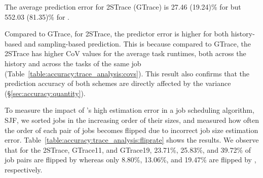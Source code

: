 {{
{The average prediction error for 2STrace (GTrace) is 27.46 (19.24)\% for \namepredict
but 552.03 (81.35)\%} for \primarybasepredict.
\fi


Compared to GTrace,  for 2STrace,
the predictor error is higher for both history-based and sampling-based
prediction. This is because
compared to GTrace, the 2STrace has higher CoV values for
the average task runtimes, both across the history and across the tasks of
the same job (Table~\ref{table:accuracy:trace_analysis:covs}). This result
also confirms that the prediction accuracy of both schemes are directly affected by 
the variance (\S\ref{sec:accuracy:quantity}).


{To measure the impact of \primarybasepredict's high estimation error in
a job scheduling algorithm, \eg SJF, 
we sorted jobs in the increasing order of their sizes, and measured how often
the order of each pair of jobs becomes flipped due to incorrect job size
estimation error.  Table~\ref{table:accuracy:trace_analysis:fliprate} shows the
results.  We observe that for the 2STrace, GTrace11, and GTrace19, 23.71\%,
25.83\%, and 39.72\% of job pairs are flipped by \primarybasepredict whereas
only 8.80\%, 13.06\%, and 19.47\% are flipped by \name, respectively.

}

}}
